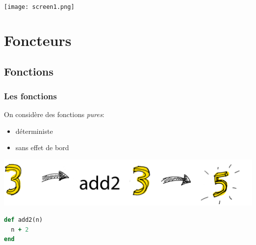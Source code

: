 \documentclass{beamer}
\begin{document}
\begin{frame}
  \begin{columns}[t]
  \begin{column}{5cm}
  \tableofcontents[sections={1-3}]
  \end{column}
  \begin{column}{5cm}
  \tableofcontents[sections={4-8}]
  \end{column}
  \end{columns}
\end{frame}

\begin{frame}

\begin{center}
\texttt{[image: screen1.png]}
\end{center}

\end{frame}


\section{Foncteurs}

\subsection{Fonctions}
\begin{frame}[fragile]
\frametitle{Les fonctions}
\begin{block}{}
On considère des fonctions \emph{pures}:
\begin{itemize}
\item déterministe
\item sans effet de bord
\end{itemize}
\end{block}
\begin{center}
\includegraphics[scale=0.2]{fct.png}
\end{center}
\pause
\begin{block}{}
\begin{lstlisting}[language=ruby,basicstyle=\ttfamily,keywordstyle=\color{red}]
def add2(n)
  n + 2
end
\end{lstlisting}
\end{block}
\end{frame}
\end{document}
